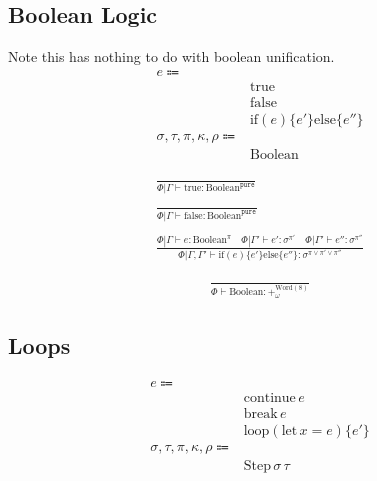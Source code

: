 \documentclass {article}
\begin{document}
\subsection{Boolean Logic}
Note this has nothing to do with boolean unification.
\begin{align*}
e \Coloneqq & \\
& \text{true} \\
& \text{false} \\
& \text{if} (e) \{ e' \} \text{else} \{ e'' \} \\
\sigma, \tau, \pi, \kappa, \rho \Coloneqq & \\
& \text{Boolean}
\end{align*}

\begin{gather*}
\frac
{}
{ \Phi | \Gamma \vdash \text{true} : \text{Boolean}^\texttt{pure}} \\
\\
\frac
{}
{ \Phi | \Gamma \vdash \text{false} : \text{Boolean}^\texttt{pure}} \\
\\
\frac
{\Phi | \Gamma \vdash e : \text{Boolean}^\pi \quad \Phi | \Gamma' \vdash e' : \sigma^{\pi'} \quad \Phi | \Gamma' \vdash e'' : \sigma^{\pi''} }
{\Phi | \Gamma, \Gamma' \vdash \text{if} (e) \{ e' \} \text{else} \{ e'' \} : \sigma^{\pi \lor \pi' \lor \pi''} }
\end{gather*}

\begin{gather*}
\frac
{}
{ \Phi \vdash \text{Boolean} : +^{\text{Word}(8)}_\omega}
\end{gather*}

\subsection{Loops}
\begin{align*}
e \Coloneqq & \\
& \text{continue} \, e \tag{continue} \\
& \text{break} \, e \tag{break} \\
& \text{loop} (\text{let} \, x = e) \{ e' \} \tag{loop} \\
\sigma, \tau, \pi, \kappa, \rho \Coloneqq & \\
& \text{Step} \, \sigma \, \tau \tag{Loop Instruction}
\end{align*}
\end{document}
